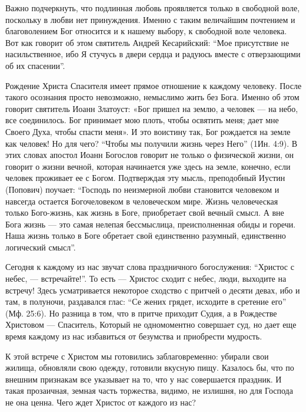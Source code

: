 Важно подчеркнуть, что подлинная любовь проявляется только в свободной воле,
поскольку в любви нет принуждения. Именно с таким величайшим почтением и
благоволением Бог относится и к нашему выбору, к свободной воле человека. Вот
как говорит об этом святитель Андрей Кесарийский: \enquote{Мое присутствие не
насильственное, ибо Я стучусь в двери сердца и радуюсь вместе с отверзающими об
их спасении}.

Рождение Христа Спасителя имеет прямое отношение к каждому человеку. После
такого осознания просто невозможно, немыслимо жить без Бога. Именно об этом
говорит святитель Иоанн Златоуст: «Бог пришел на землю, а человек — на небо,
все соединилось. Бог принимает мою плоть, чтобы освятить меня; дает мне Своего
Духа, чтобы спасти меня». И это воистину так, Бог рождается на земле как
человек! Но для чего? \enquote{Чтобы мы получили жизнь через Него} (1Ин. 4:9). В этих
словах апостол Иоанн Богослов говорит не только о физической жизни, он говорит
о жизни вечной, которая начинается уже здесь на земле, конечно, если человек
проживает ее с Богом. Подтверждая эту мысль, преподобный Иустин (Попович)
поучает: \enquote{Господь по неизмерной любви становится человеком и навсегда остается
Богочеловеком в человеческом мире. Жизнь человеческая только Бого-жизнь, как
жизнь в Боге, приобретает свой вечный смысл. А вне Бога жизнь — это самая
нелепая бессмыслица, преисполненная обиды и горечи. Наша жизнь только в Боге
обретает свой единственно разумный, единственно логический смысл}.

Сегодня к каждому из нас звучат слова праздничного богослужения: \enquote{Христос с
небес, — встречайте!}. То есть — Христос сходит с небес, люди, выходите на
встречу! Здесь усматривается некоторое сходство с притчей о десяти девах, ибо и
там, в полуночи, раздавался глас: \enquote{Се жених грядет, исходите в сретение его}
(Мф. 25:6). Но разница в том, что в притче приходит Судия, а в Рождестве
Христовом — Спаситель, Который не одномоментно совершает суд, но дает еще время
каждому из нас избавиться от безумства и приобрести мудрость.

К этой встрече с Христом мы готовились заблаговременно: убирали свои жилища,
обновляли свою одежду, готовили вкусную пищу. Казалось бы, что по внешним
признакам все указывает на то, что у нас совершается праздник. И такая
прозаичная, земная часть торжества, видимо, не излишня, но для Господа не она
ценна. Чего ждет Христос от каждого из нас?

